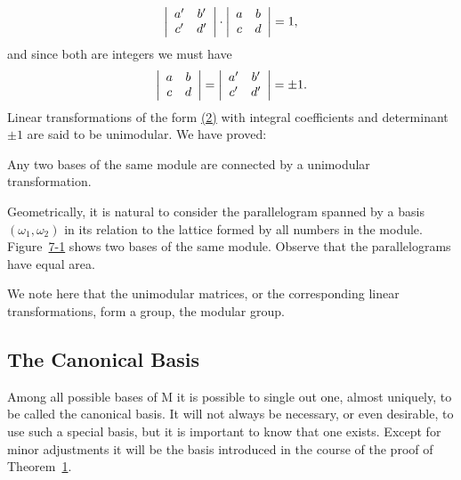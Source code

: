 \begin{equation*}
\left| \begin{array}{c c} a ^ {\prime} & b ^ {\prime} \\ c ^ {\prime} & d ^ {\prime} \end{array} \right| \cdot \left| \begin{array}{c c} a & b \\ c & d \end{array} \right| = 1,
\end{equation*}
and since both are integers we must have
\begin{equation*}
\left| \begin{array}{c c} a & b \\ c & d \end{array} \right| = \left| \begin{array}{c c} a ^ {\prime} & b ^ {\prime} \\ c ^ {\prime} & d ^ {\prime} \end{array} \right| = \pm 1.
\end{equation*}
Linear transformations of the form \hyperref[eq:7.2]{(2)} with integral coefficients and determinant $\pm1$ are said to be unimodular. We have proved:

\begin{originalassertion}
Any two bases of the same module are connected by a unimodular transformation.
\end{originalassertion}

Geometrically, it is natural to consider the parallelogram spanned by a basis $(\omega_{1},\omega_{2})$ in its relation to the lattice formed by all numbers in the module. Figure~\hyperref[fig:7-1]{7-1} shows two bases of the same module. Observe that the parallelograms have equal area.

We note here that the unimodular matrices, or the corresponding linear transformations, form a group, the modular group.


\setcounter{section}{2}\setcounter{subsection}{2}\subsection{The Canonical Basis}\label{sec:7.2.3}
Among all possible bases of M it is possible to single out one, almost uniquely, to be called the canonical basis. It will not always be necessary, or even desirable, to use such a special basis, but it is important to know that one exists. Except for minor adjustments it will be the basis introduced in the course of the proof of Theorem~\hyperref[thm:7.1]{1}.

